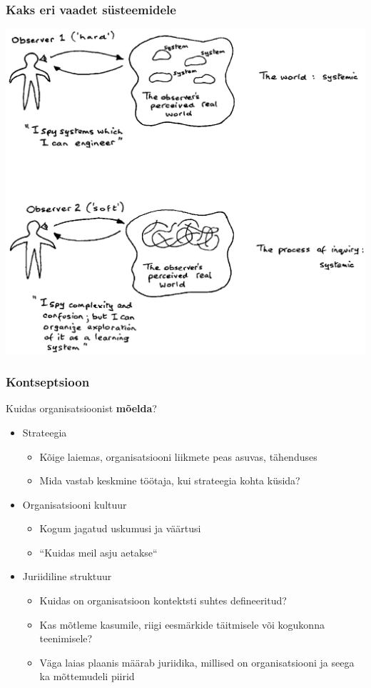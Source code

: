 \documentclass{beamer}
\begin{document}
\begin{frame}[fragile]
	\frametitle{Kaks eri vaadet süsteemidele}

	\begin{center}
	\includegraphics[width=.7\textwidth]{checkland.png}
	
	\cite{checkland2000soft}
	\end{center}
\end{frame}
\begin{frame}
	\frametitle{Kontseptsioon}
		Kuidas organisatsioonist \textbf{mõelda}?
			\begin{itemize}
				\item Strateegia
				\begin{itemize}
					\item Kõige laiemas, organisatsiooni liikmete peas asuvas, tähenduses
					\item Mida vastab keskmine töötaja, kui strateegia kohta küsida?
				\end{itemize}
				\item Organisatsiooni kultuur
				\begin{itemize}
					\item Kogum jagatud uskumusi ja väärtusi
					\item ``Kuidas meil asju aetakse``
				\end{itemize}
				\item Juriidiline struktuur
				\begin{itemize}
					\item Kuidas on organisatsioon kontektsti suhtes defineeritud?
					\item Kas mõtleme kasumile, riigi eesmärkide täitmisele või kogukonna teenimisele?
					\item Väga laias plaanis määrab juriidika, millised on organisatsiooni ja seega ka mõttemudeli piirid
				\end{itemize}				
			\end{itemize}
\end{frame}
\end{document}
